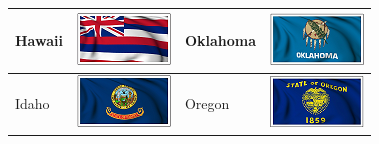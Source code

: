 \documentclass{ximera}
\begin{document}
\begin{center}
\begin{tabular}{|l|l|l|l|}
Hawaii & \includegraphics{pics/StateFlags/Hawaii.png} & Oklahoma & \includegraphics{pics/StateFlags/Oklahoma.png} \\\hline 
Idaho & \includegraphics{pics/StateFlags/Idaho.png} & Oregon & \includegraphics{pics/StateFlags/Oregon.png} \\\hline 




\end{tabular}
\end{center}
\end{document}
